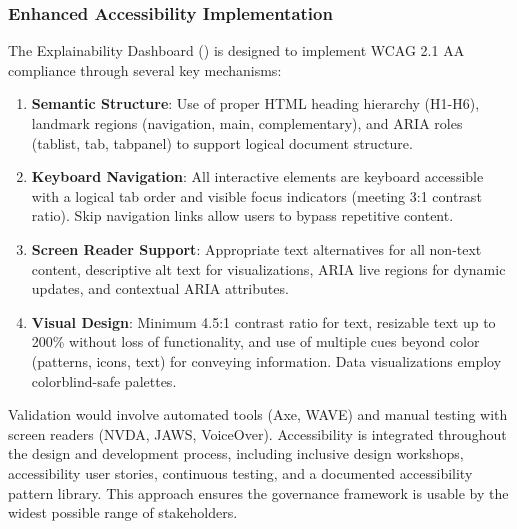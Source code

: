 \documentclass[manuscript,screen,review,anonymous,9pt]{acmart}
\begin{document}
\subsubsection{Enhanced Accessibility Implementation}
\label{subsubsec:enhanced_accessibility}
The Explainability Dashboard () is designed to implement WCAG 2.1 AA compliance through several key mechanisms:
\begin{enumerate}[leftmargin=*,itemsep=1pt,parsep=1pt]
    \item \textbf{Semantic Structure}: Use of proper HTML heading hierarchy (H1-H6), landmark regions (navigation, main, complementary), and ARIA roles (tablist, tab, tabpanel) to support logical document structure.
    \item \textbf{Keyboard Navigation}: All interactive elements are keyboard accessible with a logical tab order and visible focus indicators (meeting 3:1 contrast ratio). Skip navigation links allow users to bypass repetitive content.
    \item \textbf{Screen Reader Support}: Appropriate text alternatives for all non-text content, descriptive alt text for visualizations, ARIA live regions for dynamic updates, and contextual ARIA attributes.
    \item \textbf{Visual Design}: Minimum 4.5:1 contrast ratio for text, resizable text up to 200\% without loss of functionality, and use of multiple cues beyond color (patterns, icons, text) for conveying information. Data visualizations employ colorblind-safe palettes.
\end{enumerate}
Validation would involve automated tools (Axe, WAVE) and manual testing with screen readers (NVDA, JAWS, VoiceOver). Accessibility is integrated throughout the design and development process, including inclusive design workshops, accessibility user stories, continuous testing, and a documented accessibility pattern library. This approach ensures the governance framework is usable by the widest possible range of stakeholders.
\end{document}
